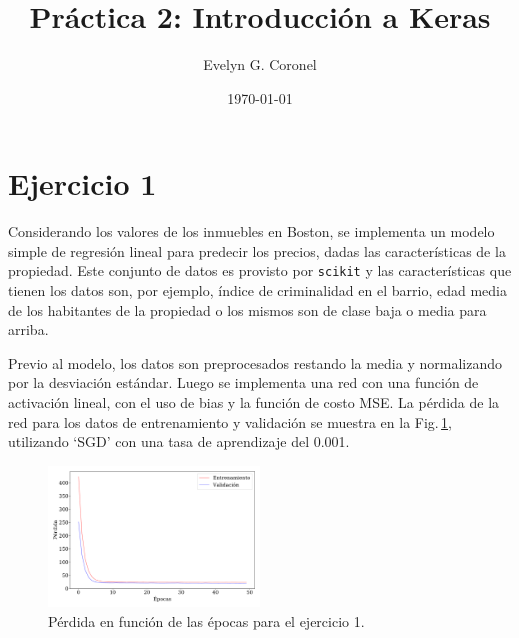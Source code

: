 
\usepackage{multirow}


\title{Práctica 2: Introducción a Keras}
\author{Evelyn G. Coronel}


\date[]{\lowercase{\today}} 

\maketitle

\section*{Ejercicio 1}

    Considerando los valores de los inmuebles en Boston, se implementa un modelo simple de regresión lineal para predecir los precios, dadas las características de la propiedad. Este conjunto de datos es provisto por \verb|scikit| y las características que tienen los datos son, por ejemplo, índice de criminalidad en el barrio, edad media de los habitantes de la propiedad o los mismos son de clase baja o media para arriba.


    Previo al modelo, los datos son preprocesados restando la media y normalizando por la desviación estándar. Luego se implementa una red con una función de activación lineal, con el uso de bias y la función de costo MSE. La pérdida de la red para los datos de entrenamiento y validación se muestra en la Fig.\,\ref{fig:ejer1_loss}, utilizando `SGD' con una tasa de aprendizaje del 0.001.


    \begin{figure}[H]
        \begin{small}
            \begin{center}
                \includegraphics[width=0.5\textwidth]{Graphs/ejer1_loss.pdf}
            \end{center}
            \caption{Pérdida en función de las épocas para el ejercicio 1.}
            \label{fig:ejer1_loss}
        \end{small}
    \end{figure}

